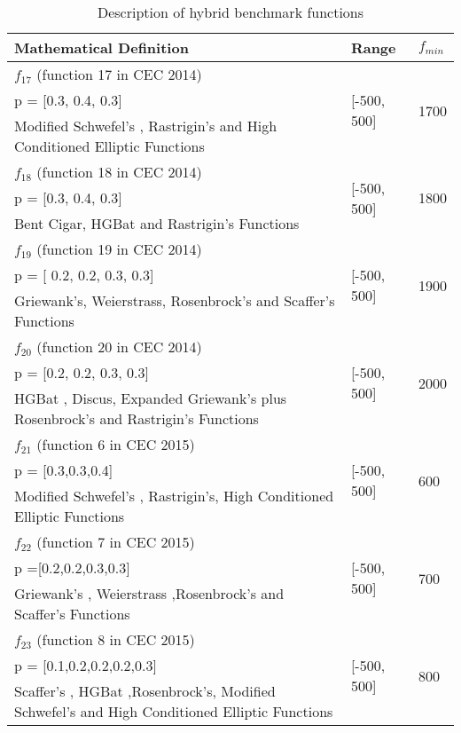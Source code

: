 \documentclass[../main.tex]{subfiles}
\begin{document}
\begin{table}[!t]
\caption{Description of hybrid benchmark functions}
\label{tbl_hybrid_funcs}
\centering
\begin{tabular}{p{9cm} p{2cm} p{1cm}}
 \hline Mathematical Definition & Range & $f_{min}$  \\ 
 \hline
$f_{17}$ (function 17 in CEC 2014) & \multirow{3}{*}{[-500, 500]} & \multirow{3}{*}{1700} \\
p = [0.3, 0.4, 0.3] & \\
Modified Schwefel's , Rastrigin's  and High Conditioned Elliptic Functions & \\ \hline
$f_{18}$ (function 18 in CEC 2014) & \multirow{3}{2cm}{[-500, 500]} & \multirow{3}{1cm}{1800} \\
p = [0.3, 0.4, 0.3] & \\
Bent Cigar, HGBat and Rastrigin’s Functions & \\ \hline
$f_{19}$ (function 19 in CEC 2014) & \multirow{3}{2cm}{[-500, 500]} & \multirow{3}{1cm}{1900} \\
p = [ 0.2, 0.2, 0.3, 0.3] & \\
Griewank’s, Weierstrass, Rosenbrock’s and Scaffer’s Functions & \\ \hline
$f_{20}$ (function 20 in CEC 2014) & \multirow{3}{2cm}{[-500, 500]} & \multirow{3}{1cm}{2000} \\
p =  [0.2, 0.2, 0.3, 0.3] & \\
HGBat , Discus, Expanded Griewank’s plus Rosenbrock’s  and Rastrigin’s Functions & \\ \hline
$f_{21}$ (function 6 in CEC 2015) & \multirow{3}{2cm}{[-500, 500]} & \multirow{3}{1cm}{600} \\
p =  [0.3,0.3,0.4]  & \\
Modified Schwefel's , Rastrigin's, High Conditioned Elliptic Functions & \\ \hline
$f_{22}$ (function 7 in CEC 2015) & \multirow{3}{2cm}{[-500, 500]} & \multirow{3}{1cm}{700} \\
p =[0.2,0.2,0.3,0.3]  & \\
Griewank's , Weierstrass ,Rosenbrock's and Scaffer's Functions & \\ \hline
$f_{23}$ (function 8 in CEC 2015) & \multirow{3}{2cm}{[-500, 500]} & \multirow{3}{1cm}{800} \\
p = [0.1,0.2,0.2,0.2,0.3]  & \\
Scaffer’s , HGBat ,Rosenbrock’s, Modified Schwefel’s and High Conditioned Elliptic Functions & \\ \hline
\end{tabular}
\end{table}
\end{document}
